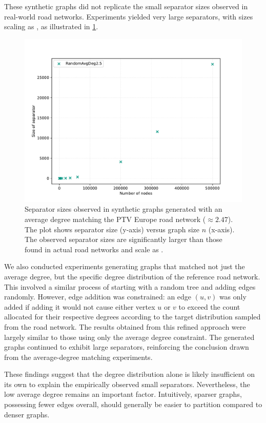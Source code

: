 These synthetic graphs did not replicate the small separator sizes observed in real-world road networks.
Experiments yielded very large separators, with sizes scaling as , as illustrated in \cref{fig:same_degree}.

\begin{figure}
    \centering
    \includegraphics[width=0.6\linewidth]{graphics/RandomAvgDeg2.5.pdf} 
    \caption{Separator sizes observed in synthetic graphs generated with an average degree matching the PTV Europe road network (\( \approx 2.47 \)). The plot shows separator size (y-axis) versus graph size \(n\) (x-axis). The observed separator sizes are significantly larger than those found in actual road networks and scale as .}
    \label{fig:same_degree}
\end{figure}

We also conducted experiments generating graphs that matched not just the average degree, but the specific degree distribution of the reference road network.
This involved a similar process of starting with a random tree and adding edges randomly.
However, edge addition was constrained: an edge \( (u, v) \) was only added if adding it would not cause either vertex \(u\) or \(v\) to exceed the count allocated for their respective degrees according to the target distribution sampled from the road network.
The results obtained from this refined approach were largely similar to those using only the average degree constraint.
The generated graphs continued to exhibit large separators, reinforcing the conclusion drawn from the average-degree matching experiments.

These findings suggest that the degree distribution alone is likely insufficient on its own to explain the empirically observed small separators.
Nevertheless, the low average degree remains an important factor.
Intuitively, sparser graphs, possessing fewer edges overall, should generally be easier to partition compared to denser graphs.
